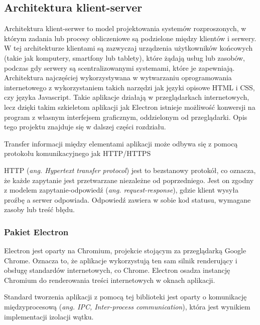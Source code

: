 \documentclass[12pt,a4paper,twoside]{article}
\begin{document}
\subsection{Architektura klient-server}
Architektura klient-serwer to model projektowania systemów rozproszonych, w którym zadania lub procesy obliczeniowe są podzielone między klientów i serwery. W tej architekturze klientami są zazwyczaj urządzenia użytkowników końcowych (takie jak komputery, smartfony lub tablety), które żądają usług lub zasobów, podczas gdy serwery są scentralizowanymi systemami, które je zapewniają. Architektura najczęściej wykorzystywana w wytwarzaniu oprogramowania internetowego z wykorzystaniem takich narzędzi jak języki opisowe HTML i CSS, czy języka Javascript. Takie aplikacje działają w przeglądarkach internetowych, lecz dzięki takim szkieletom aplikacji jak Electron istnieje możliwość konwersji na program z własnym interfejsem graficznym, oddzielonym od przeglądarki. Opis tego projektu znajduje się w dalszej części rozdziału.\par
Transfer informacji między elementami aplikacji może odbywa się z pomocą protokołu komunikacyjnego jak HTTP/HTTPS \par
HTTP (\textit{ang. Hypertext transfer protocol}) jest to bezstanowy protokół, co oznacza, że każde zapytanie jest przetwarzane niezależne od poprzedniego. Jest on zgodny z modelem zapytanie-odpowiedź (\textit{ang. request-response}), gdzie klient wysyła proźbę a serwer odpowiada. Odpowiedź zawiera w sobie kod statusu, wymagane zasoby lub treść błędu.\par
\subsubsection{Pakiet Electron}
Electron jest oparty na Chromium, projekcie stojącym za przeglądarką Google Chrome. Oznacza to, że aplikacje wykorzystują ten sam silnik renderujący i obsługę standardów internetowych, co Chrome. Electron osadza instancję Chromium do renderowania treści internetowych w oknach aplikacji.\par
Standard tworzenia aplikacji z pomocą tej biblioteki jest oparty o komunikację międzyprocesową (\textit{ang. IPC, Inter-process communication}), która jest wynikiem implementacji izolacji wątku. 
\end{document}
